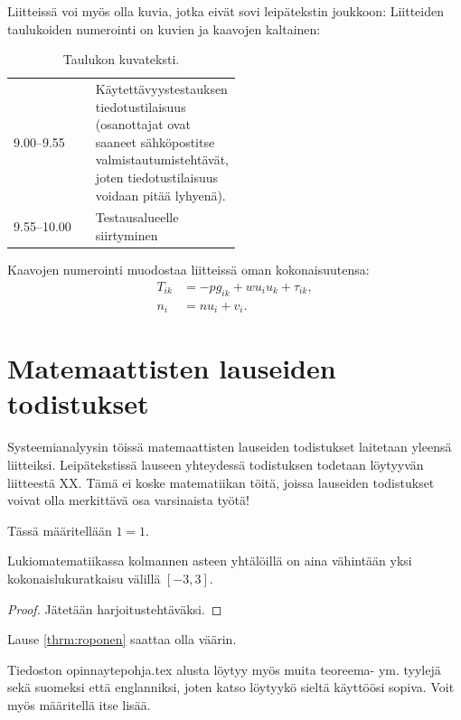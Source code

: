 Liitteissä voi myös olla kuvia, jotka
eivät sovi leipätekstin joukkoon:
Liitteiden taulukoiden numerointi on kuvien ja kaavojen kaltainen:
\begin{table}[htb]
\caption{Taulukon kuvateksti.}
\label{liitetaulukko}
\centering
\begin{tabular}{|lp{0.5\linewidth}|}
\hline
9.00--9.55  & Käytettävyystestauksen tiedotustilaisuus (osanottajat
ovat saaneet sähköpostitse valmistautumistehtävät, joten tiedotustilaisuus
voidaan pitää lyhyenä).\\
9.55--10.00 & Testausalueelle siirtyminen \\
\hline
\end{tabular}
\end{table}
Kaavojen numerointi muodostaa liitteissä oman kokonaisuutensa:
\begin{align}
T_{ik} &= -p g_{ik} + w u_i u_k + \tau_{ik},  \label{liitekaava3} \\
n_i    &= n u_i + v_i.                      \label{liitekaava4}
\end{align}

\clearpage
\section{Matemaattisten lauseiden todistukset\label{LiiteC}}
Systeemianalyysin töissä matemaattisten lauseiden todistukset laitetaan yleensä liitteiksi. Leipätekstissä lauseen yhteydessä todistuksen todetaan löytyyvän liitteestä XX. Tämä ei koske matematiikan töitä, joissa lauseiden todistukset voivat olla merkittävä osa varsinaista työtä!
\begin{maaritelma}
Tässä määritellään $1=1$.
\end{maaritelma}

\begin{lause}\label{thrm:roponen}
Lukiomatematiikassa kolmannen asteen yhtälöillä on aina vähintään yksi kokonaislukuratkaisu välillä $[-3,3]$.
\end{lause}
\begin{proof}
Jätetään harjoitustehtäväksi.
\end{proof}

\begin{huomautus}
Lause \ref{thrm:roponen} saattaa olla väärin.
\end{huomautus}

Tiedoston opinnaytepohja.tex alusta löytyy myös muita teoreema- ym. tyylejä sekä suomeksi että englanniksi, joten katso löytyykö sieltä käyttöösi sopiva. Voit myös määritellä itse lisää.